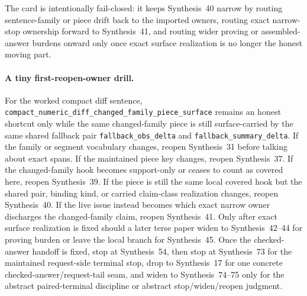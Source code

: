 \documentclass[11pt]{article}
\begin{document}
The card is intentionally fail-closed: it keeps Synthesis~40 narrow by routing sentence-family or piece drift back to the imported owners, routing exact narrow-stop ownership forward to Synthesis~41, and routing wider proving or assembled-answer burdens onward only once exact surface realization is no longer the honest moving part.

\paragraph{A tiny first-reopen-owner drill.}
For the worked compact diff sentence, \nolinkurl{compact_numeric_diff_changed_family_piece_surface} remains an honest shortcut only while the same changed-family piece is still \textsf{surface}-carried by the same shared fallback pair \nolinkurl{fallback_obs_delta} and \nolinkurl{fallback_summary_delta}. If the family or segment vocabulary changes, reopen Synthesis~31 before talking about exact spans. If the maintained piece key changes, reopen Synthesis~37. If the changed-family hook becomes support-only or ceases to count as covered here, reopen Synthesis~39. If the piece is still the same local covered hook but the shared pair, binding kind, or carried claim-class realization changes, reopen Synthesis~40. If the live issue instead becomes which exact narrow owner discharges the changed-family claim, reopen Synthesis~41. Only after exact surface realization is fixed should a later terse paper widen to Synthesis~42--44 for proving burden or leave the local branch for Synthesis~45. Once the checked-answer handoff is fixed, stop at Synthesis~54, then stop at Synthesis~73 for the maintained request-side terminal stop, drop to Synthesis~17 for one concrete checked-answer/request-tail seam, and widen to Synthesis~74--75 only for the abstract paired-terminal discipline or abstract stop/widen/reopen judgment.\cite{series:workedexample}
\end{document}
